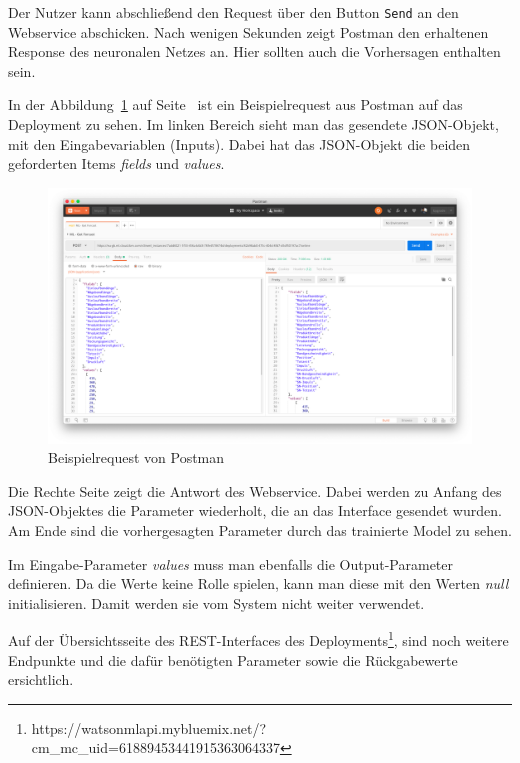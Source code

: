 Der Nutzer kann abschließend den Request über den Button \texttt{Send} an den Webservice abschicken. Nach wenigen
Sekunden zeigt Postman den erhaltenen Response des neuronalen Netzes an. Hier sollten auch die Vorhersagen enthalten
sein.

In der Abbildung~\ref{fig:umsetzung_deployment_postman} auf Seite~\pageref{fig:umsetzung_deployment_postman} ist ein
Beispielrequest aus Postman auf das Deployment zu sehen. Im linken Bereich sieht man das gesendete JSON-Objekt, mit den
Eingabevariablen (Inputs). Dabei hat das JSON-Objekt die beiden geforderten Items \textit{fields} und \textit{values}.

\begin{figure}[h]
    \centering
    \includegraphics[width=\textwidth]{images/kapitel_3/deployment_postman.png}
    \caption{Beispielrequest von Postman}
    \label{fig:umsetzung_deployment_postman}
\end{figure}

Die Rechte Seite zeigt die Antwort des Webservice. Dabei werden zu Anfang des JSON-Objektes die Parameter wiederholt,
die an das Interface gesendet wurden. Am Ende sind die vorhergesagten Parameter durch das trainierte Model zu sehen.

Im Eingabe-Parameter \textit{values} muss man ebenfalls die Output-Parameter definieren. Da die Werte keine Rolle
spielen, kann man diese mit den Werten \textit{null} initialisieren. Damit werden sie vom System nicht weiter verwendet.

Auf der Übersichtsseite des REST-Interfaces des
Deployments\footnote{https://watson\-ml\-api.mybluemix.net/?cm\_mc\_uid=61889453441915363064337}, sind noch weitere
Endpunkte und die dafür benötigten Parameter sowie die Rückgabewerte ersichtlich.

